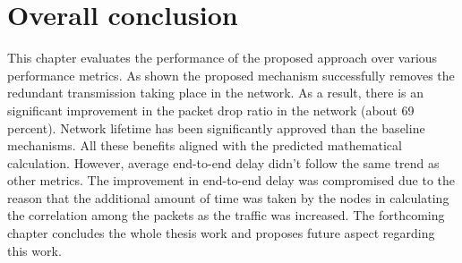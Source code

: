 \section{Overall conclusion}
This chapter evaluates the performance of the proposed approach over various performance metrics. As shown the proposed mechanism successfully removes the redundant transmission taking place in the network. As a result, there is an significant improvement in the packet drop ratio in the network (about 69 percent). Network lifetime has been significantly approved than the baseline mechanisms. All these benefits aligned with the predicted mathematical calculation. However, average end-to-end delay didn't follow the same trend as other metrics. The improvement in end-to-end delay was compromised due to the reason that the additional amount of time was taken by the nodes in calculating the correlation among the packets as the traffic was increased. The forthcoming chapter concludes the whole thesis work and proposes future aspect regarding this work.